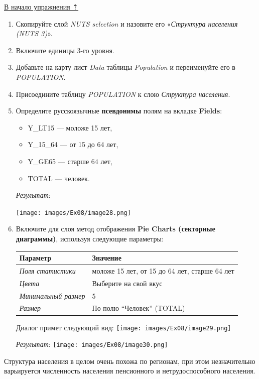\documentclass[12pt,]{book}
\providecommand{\tightlist}{%
  \setlength{\itemsep}{0pt}\setlength{\parskip}{0pt}}
\begin{document}
\protect\hyperlink{stat-map-economic}{В начало упражнения ⇡}

\begin{enumerate}
\def\labelenumi{\arabic{enumi}.}
\item
  Скопируйте слой \emph{NUTS selection} и назовите его «\emph{Структура населения (NUTS 3)}».
\item
  Включите единицы 3-го уровня.
\item
  Добавьте на карту лист \emph{Data} таблицы \emph{Population} и переименуйте его в \emph{POPULATION}.
\item
  Присоедините таблицу \emph{POPULATION} к слою \emph{Структура населения}.
\item
  Определите русскоязычные \textbf{псевдонимы} полям на вкладке \textbf{Fields}:

  \begin{itemize}
  \tightlist
  \item
    Y\_LT15 --- моложе 15 лет,
  \item
    Y\_15\_64 --- от 15 до 64 лет,
  \item
    Y\_GE65 --- старше 64 лет,
  \item
    TOTAL --- человек.
  \end{itemize}

  \emph{Результат}:

  \texttt{[image: images/Ex08/image28.png]}
\item
  Включите для слоя метод отображения \textbf{Pie Charts (секторные диаграммы)}, используя следующие параметры:

  \begin{longtable}[]{@{}ll@{}}
  \toprule
  Параметр & Значение\tabularnewline
  \midrule
  \endhead
  \emph{Поля статистики} & моложе 15 лет, от 15 до 64 лет, старше 64 лет\tabularnewline
  \emph{Цвета} & Выберите на свой вкус\tabularnewline
  \emph{Минимальный размер} & 5\tabularnewline
  \emph{Размер} & По полю ``Человек'' (TOTAL)\tabularnewline
  \bottomrule
  \end{longtable}

  Диалог примет следующий вид:
  \texttt{[image: images/Ex08/image29.png]}

  \emph{Результат}:
  \texttt{[image: images/Ex08/image30.png]}
\end{enumerate}

Структура населения в целом очень похожа по регионам, при этом незначительно варьируется численность населения пенсионного и нетрудоспособного населения.
\end{document}
